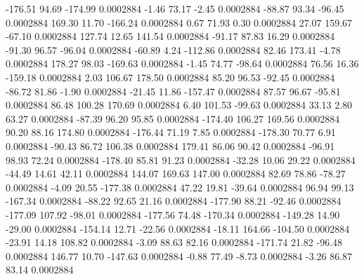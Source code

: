      -176.51       94.69     -174.99     0.0002884
       -1.46       73.17       -2.45     0.0002884
      -88.87       93.34      -96.45     0.0002884
      169.30       11.70     -166.24     0.0002884
        0.67       71.93        0.30     0.0002884
       27.07      159.67      -67.10     0.0002884
      127.74       12.65      141.54     0.0002884
      -91.17       87.83       16.29     0.0002884
      -91.30       96.57      -96.04     0.0002884
      -60.89        4.24     -112.86     0.0002884
       82.46      173.41       -4.78     0.0002884
      178.27       98.03     -169.63     0.0002884
       -1.45       74.77      -98.64     0.0002884
       76.56       16.36     -159.18     0.0002884
        2.03      106.67      178.50     0.0002884
       85.20       96.53      -92.45     0.0002884
      -86.72       81.86       -1.90     0.0002884
      -21.45       11.86     -157.47     0.0002884
       87.57       96.67      -95.81     0.0002884
       86.48      100.28      170.69     0.0002884
        6.40      101.53      -99.63     0.0002884
       33.13        2.80       63.27     0.0002884
      -87.39       96.20       95.85     0.0002884
     -174.40      106.27      169.56     0.0002884
       90.20       88.16      174.80     0.0002884
     -176.44       71.19        7.85     0.0002884
     -178.30       70.77        6.91     0.0002884
      -90.43       86.72      106.38     0.0002884
      179.41       86.06       90.42     0.0002884
      -96.91       98.93       72.24     0.0002884
     -178.40       85.81       91.23     0.0002884
      -32.28       10.06       29.22     0.0002884
      -44.49       14.61       42.11     0.0002884
      144.07      169.63      147.00     0.0002884
       82.69       78.86      -78.27     0.0002884
       -4.09       20.55     -177.38     0.0002884
       47.22       19.81      -39.64     0.0002884
       96.94       99.13     -167.34     0.0002884
      -88.22       92.65       21.16     0.0002884
     -177.90       88.21      -92.46     0.0002884
     -177.09      107.92      -98.01     0.0002884
     -177.56       74.48     -170.34     0.0002884
     -149.28       14.90      -29.00     0.0002884
     -154.14       12.71      -22.56     0.0002884
      -18.11      164.66     -104.50     0.0002884
      -23.91       14.18      108.82     0.0002884
       -3.09       88.63       82.16     0.0002884
     -171.74       21.82      -96.48     0.0002884
      146.77       10.70     -147.63     0.0002884
       -0.88       77.49       -8.73     0.0002884
       -3.26       86.87       83.14     0.0002884
